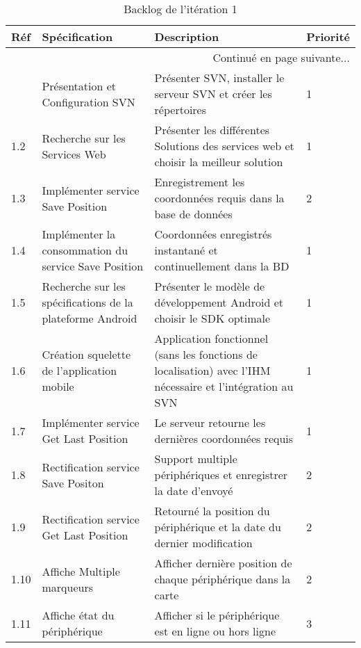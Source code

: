 \begin{center}
    \footnotesize
    \begin{longtable}{| p{1cm} | p{5cm} | p{7cm} | p{1cm} |}
        \caption{Backlog de l'itération 1}
\label{tab:sprint1-backlog} \\

        \hline
        \textbf{Réf} & \textbf{Spécification} & \textbf{Description} & \textbf{Priorité} \\ \hline
        \endhead

        \hline \multicolumn{4}{|r|}{{Continué en page suivante$\dotsc$}} \\ \hline
        \endfoot

        \hline \hline
        \endlastfoot

        \hline
1.1 & Présentation et Configuration SVN & Présenter SVN, installer le serveur SVN et créer les répertoires & 1 \\ \hline
1.2 & Recherche sur les Services Web & Présenter les différentes Solutions des services web et choisir la meilleur solution & 1 \\ \hline
1.3 & Implémenter service Save Position & Enregistrement les coordonnées requis dans la base de données & 2 \\ \hline
1.4 & Implémenter la consommation du service Save Position & Coordonnées enregistrés instantané et continuellement dans la BD & 1 \\ \hline
1.5 & Recherche sur les spécifications de la plateforme Android & Présenter le modèle de développement Android et choisir le SDK optimale & 1 \\ \hline
1.6 & Création squelette de l'application mobile & Application fonctionnel (sans les fonctions de localisation) avec l'IHM nécessaire et l'intégration au SVN & 1 \\ \hline
1.7 & Implémenter service Get Last Position & Le serveur retourne les dernières coordonnées requis & 1 \\ \hline
1.8 & Rectification service Save Positon & Support multiple périphériques et enregistrer la date d'envoyé & 2 \\ \hline
1.9 & Rectification service Get Last Position & Retourné la position du périphérique et la date du dernier modification & 2 \\ \hline
1.10 & Affiche Multiple marqueurs & Afficher dernière position de chaque périphérique dans la carte & 2 \\ \hline
1.11 & Affiche état du périphérique & Afficher si le périphérique est en ligne ou hors ligne & 3 \\ \hline
    \end{longtable}
\end{center}

